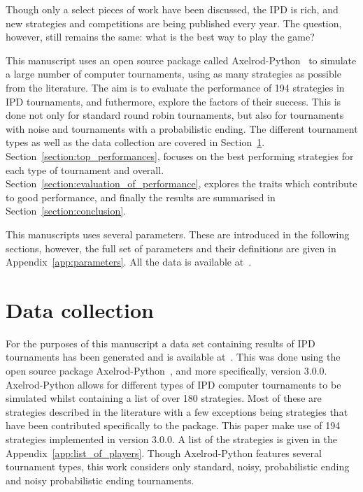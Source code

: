 \documentclass{article}
\begin{document}
Though only a select pieces of work have been discussed, the IPD is
rich, and new strategies and competitions are being published every year.
The question, however, still remains the same: what is the best way to play the
game?

This manuscript uses an open source package called
Axelrod-Python~\cite{axelrodproject} to simulate a large number of computer
tournaments, using as many strategies as possible from the literature. The aim
is to evaluate the performance of 194 strategies in IPD tournaments, and
futhermore, explore the factors of their success. This is done not only for
standard round robin tournaments, but also for tournaments with noise and
tournaments with a probabilistic ending. The different tournament types as well
as the data collection are covered in Section~\ref{section:data_collection}.
Section~\ref{section:top_performances}, focuses on the best performing strategies
for each type of tournament and overall.
Section~\ref{section:evaluation_of_performance}, explores the traits which
contribute to good performance, and finally the results are summarised in
Section~\ref{section:conclusion}.

This manuscripts uses several parameters. These are introduced in the following
sections, however, the full set of parameters and their definitions are given in
Appendix~\ref{app:parameters}. All the data is available at~\cite{data}.

\section{Data collection}\label{section:data_collection}

For the purposes of this manuscript a data set containing results of IPD tournaments
has been generated and is available at~\cite{data}. This
was done using the open source package Axelrod-Python~\cite{axelrodproject}, and
more specifically, version 3.0.0. Axelrod-Python allows for different types of
IPD computer tournaments to be simulated whilst
containing a list of over 180 strategies. Most of these are strategies described
in the literature with a few exceptions being strategies that have been
contributed specifically to the package. This paper make use of 194 strategies
implemented in version 3.0.0. A list of the strategies is given in the
Appendix~\ref{app:list_of_players}. Though Axelrod-Python features several
tournament types, this work considers only standard, noisy, probabilistic ending
and noisy probabilistic ending tournaments.
\end{document}
